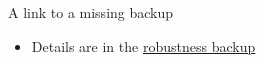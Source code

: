 \documentclass[11pt,aspectratio=169]{beamer}
\begin{document}
\begin{frame}{A link to a missing backup}
  \begin{itemize}
    \item Details are in the \hyperref[sec:nosuchbackup]{robustness backup}
  \end{itemize}
\end{frame}
\end{document}
